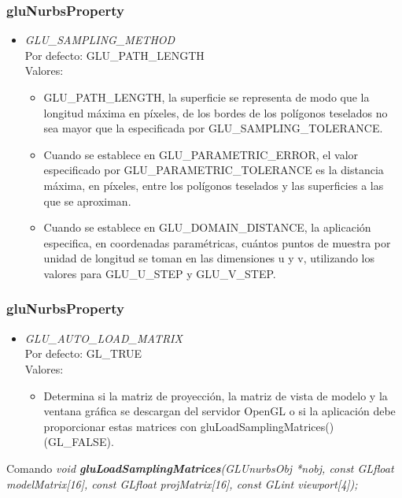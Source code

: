 \documentclass[10.5pt]{beamer}
\begin{document}
\begin{frame}[fragile]
\frametitle{gluNurbsProperty}
\small

\begin{itemize}
    \item \emph{GLU\_SAMPLING\_METHOD}\\
        Por defecto: GLU\_PATH\_LENGTH \\
        Valores:\\
        \begin{itemize}
            \item GLU\_PATH\_LENGTH,
            la superficie se representa de modo que la longitud máxima
            en píxeles, de los bordes de los polígonos teselados no
            sea mayor que la especificada por GLU\_SAMPLING\_TOLERANCE.
            \item Cuando se establece en GLU\_PARAMETRIC\_ERROR, el valor
            especificado por GLU\_PARAMETRIC\_TOLERANCE es la distancia
            máxima, en píxeles, entre los polígonos teselados y las
            superficies a las que se aproximan.
            \item Cuando se establece
            en GLU\_DOMAIN\_DISTANCE, la aplicación especifica, en
            coordenadas paramétricas, cuántos puntos de muestra por
            unidad de longitud se toman en las dimensiones u y v,
            utilizando los valores para GLU\_U\_STEP y GLU\_V\_STEP.
        \end{itemize}
\end{itemize}

\end{frame}


\begin{frame}[fragile]
\frametitle{gluNurbsProperty}
\small

\begin{itemize}
    \item \emph{GLU\_AUTO\_LOAD\_MATRIX}\\
        Por defecto: GL\_TRUE \\
        Valores:\\
        \begin{itemize}
            \item Determina si la matriz de proyección, la
            matriz de vista de modelo y la ventana gráfica se descargan
            del servidor OpenGL o si la aplicación
            debe proporcionar estas matrices con gluLoadSamplingMatrices()
            (GL\_FALSE).
        \end{itemize}
\end{itemize}

\begin{alertblock}{Comando}
    \small
    \emph{void \textbf{gluLoadSamplingMatrices}(GLUnurbsObj *nobj,
    const GLfloat modelMatrix[16], const GLfloat projMatrix[16],
    const GLint viewport[4]);}
\end{alertblock}

\end{frame}
\end{document}
